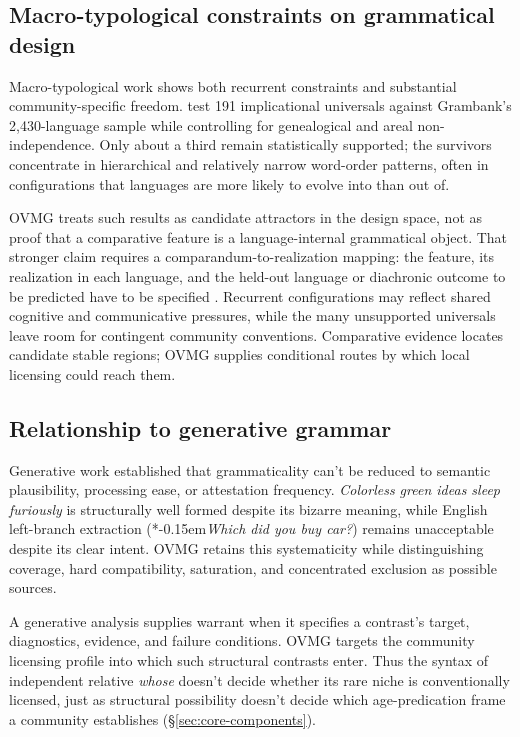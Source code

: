 \documentclass[12pt,letterpaper]{article}
\newcommand{\mention}[1]{\textit{#1}}
\newcommand{\judgesep}{\kern-0.15em}
\newcommand{\ungram}[1]{*\judgesep#1}
\begin{document}
\subsection{Macro-typological constraints on grammatical design}

Macro-typological work shows both recurrent constraints and substantial
community-specific freedom. \textcite{verkerk2025} test 191 implicational
universals against Grambank's 2{,}430-language sample while controlling for
genealogical and areal non-independence. Only about a third remain statistically
supported; the survivors concentrate in hierarchical and relatively narrow
word-order patterns, often in configurations that languages are more likely to
evolve into than out of.

OVMG treats such results as candidate attractors in the design space, not as
proof that a comparative feature is a language-internal grammatical object.
That stronger claim requires a comparandum-to-realization mapping: the feature,
its realization in each language, and the held-out language or diachronic
outcome to be predicted have to be specified \autocite{reynolds2025comparanda}.
Recurrent configurations may reflect shared cognitive and communicative
pressures, while the many unsupported universals leave room for contingent
community conventions. Comparative evidence locates candidate stable regions;
OVMG supplies conditional routes by which local licensing could reach them.

\subsection{Relationship to generative grammar}

Generative work established that grammaticality can't be reduced to semantic
plausibility, processing ease, or attestation frequency. \mention{Colorless
green ideas sleep furiously} is structurally well formed despite its bizarre
meaning, while English left-branch extraction
(\ungram{\mention{Which did you buy car?}}) remains unacceptable despite its
clear intent. OVMG retains this systematicity \autocite{dennett1991} while
distinguishing coverage, hard compatibility, saturation, and concentrated
exclusion as possible sources.

A generative analysis supplies warrant when it specifies a contrast's target,
diagnostics, evidence, and failure conditions. OVMG targets the community
licensing profile into which such structural contrasts enter. Thus the syntax
of independent relative \mention{whose} doesn't decide whether its rare niche
is conventionally licensed, just as structural possibility doesn't decide
which age-predication frame a community establishes
(\S\ref{sec:core-components}).
\end{document}
